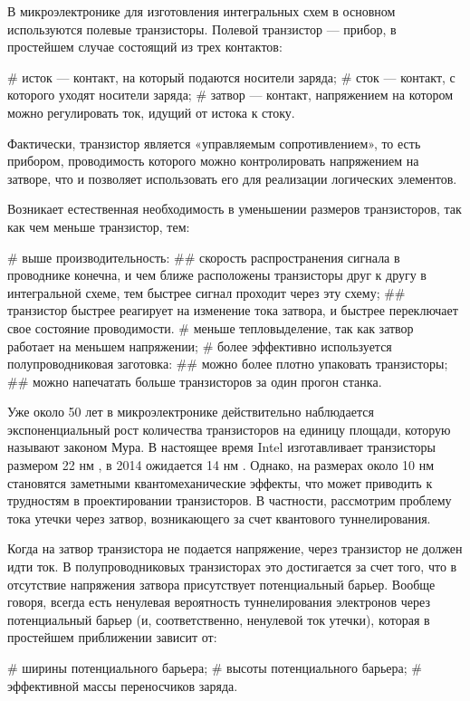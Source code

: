 \startprefacepage

В микроэлектронике для изготовления интегральных схем в основном используются полевые транзисторы. Полевой транзистор — прибор, в простейшем случае состоящий из трех контактов:
\begin{easylist}[itemize]
# исток — контакт, на который подаются носители заряда;
# сток — контакт, с которого уходят носители заряда;
# затвор — контакт, напряжением на котором можно регулировать ток, идущий от истока к стоку.
\end{easylist}
Фактически, транзистор является «управляемым сопротивлением», то есть прибором, проводимость которого можно контролировать напряжением на затворе, что и позволяет использовать его для реализации логических элементов.

Возникает естественная необходимость в уменьшении размеров транзисторов, так как чем меньше транзистор, тем:
\begin{easylist}[itemize]
# выше производительность:
## скорость распространения сигнала в проводнике конечна, и чем ближе расположены транзисторы друг к другу в интегральной схеме, тем быстрее сигнал проходит через эту схему;
## транзистор быстрее реагирует на изменение тока затвора, и быстрее переключает свое состояние проводимости.
# меньше тепловыделение, так как затвор работает на меньшем напряжении;
# более эффективно используется полупроводниковая заготовка:
## можно более плотно упаковать транзисторы;
## можно напечатать больше транзисторов за один прогон станка.
\end{easylist}

Уже около 50 лет в микроэлектронике действительно наблюдается экспоненциальный рост количества транзисторов на единицу площади, которую называют законом Мура. В настоящее время Intel изготавливает транзисторы размером 22 нм \cite{intel_22_nm}, в 2014 ожидается 14 нм \cite{14_nm}. Однако, на размерах около 10 нм становятся заметными квантомеханические эффекты, что может приводить к трудностям в проектировании транзисторов. В частности, рассмотрим проблему тока утечки через затвор, возникающего за счет квантового туннелирования.

Когда на затвор транзистора не подается напряжение, через транзистор не должен идти ток. В полупроводниковых транзисторах это достигается за счет того, что в отсутствие напряжения затвора присутствует потенциальный барьер. Вообще говоря, всегда есть ненулевая вероятность туннелирования электронов через потенциальный барьер (и, соответственно, ненулевой ток утечки), которая в простейшем приближении зависит от:
\begin{easylist}[itemize]
# ширины потенциального барьера;
# высоты потенциального барьера;
# эффективной массы переносчиков заряда.
\end{easylist}

